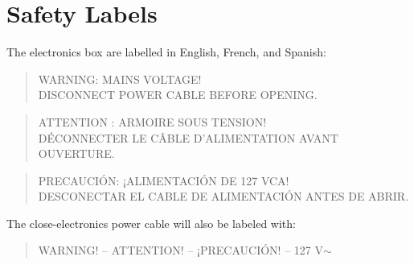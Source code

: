 \documentclass{article}
\begin{document}
\clearpage
\section{Safety Labels}

The electronics box are labelled in English, French, and Spanish: 

\begin{quote}
WARNING: MAINS VOLTAGE!\\
DISCONNECT POWER CABLE BEFORE OPENING.
\end{quote}

\begin{quote}
ATTENTION : ARMOIRE SOUS TENSION!\\
DÉCONNECTER LE CÂBLE D'ALIMENTATION AVANT OUVERTURE.
\end{quote}

\begin{quote}
PRECAUCIÓN: ¡ALIMENTACIÓN DE 127 VCA!\\
DESCONECTAR EL CABLE DE ALIMENTACIÓN ANTES DE ABRIR.
\end{quote}

The close-electronics power cable will also be labeled with:

\begin{quote}
WARNING! -- ATTENTION! -- ¡PRECAUCIÓN! -- 127 V$\sim$
\end{quote}


%
\end{document}
